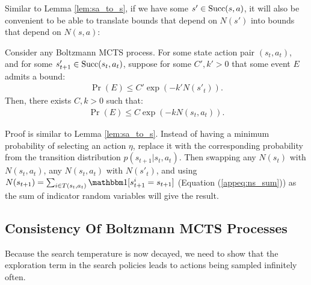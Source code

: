         Similar to Lemma \ref{lem:sa_to_s}, if we have some $s'\in{\textnormal{Succ}(s,a)}$, it will also be convenient to be able to translate bounds that depend on $N(s')$ into bounds that depend on $N(s,a)$:
        \begin{lemma} \label{lem:s_to_sa}
            Consider any Boltzmann MCTS process. For some state action pair $(s_t,a_t)$, and for some $s'_{t+1}\in{\textnormal{Succ}(s_t,a_t)}$, suppose for some $C',k'>0$ that some event $E$ admits a bound:
            \begin{align}
                \Pr(E) \leq C'\exp(-k'N(s'_t)).
            \end{align}
            Then, there exists $C,k>0$ such that:
            \begin{align}
                \Pr(E) \leq C\exp(-k N(s_t,a_t)).
            \end{align}
        \end{lemma}
        \begin{proofoutline}
            Proof is similar to Lemma \ref{lem:sa_to_s}. Instead of having a minimum probability of selecting an action $\eta$, replace it with the corresponding probability from the transition distribution $p(s_{t+1}|s_t,a_t)$. Then swapping any $N(s_t)$ with $N(s_t,a_t)$, any $N(s_t,a_t)$ with $N(s'_t)$, and using $N(s_{t+1}) = \sum_{i\in T(s_t,a_t)} \one[s^i_{t+1} = s_{t+1}]$ (Equation (\ref{appeq:ns_sum})) as the sum of indicator random variables will give the result.
        \end{proofoutline}



















    
    \subsection{Consistency Of Boltzmann MCTS Processes}

        Because the search temperature is now decayed, we need to show that the exploration term in the search policies leads to actions being sampled infinitely often.



